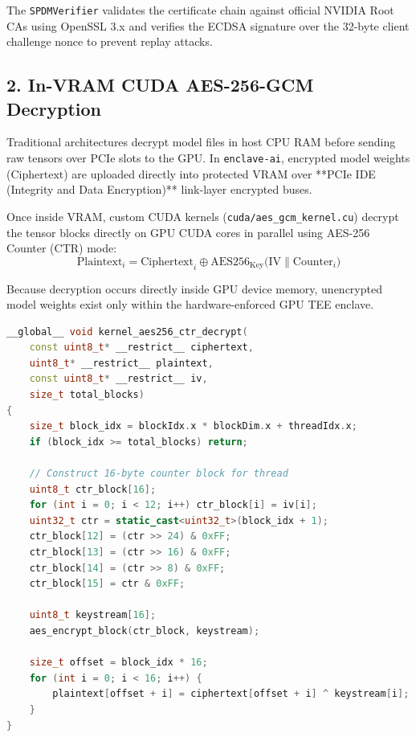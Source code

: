 \documentclass[11pt,a4paper]{article}
\begin{document}
The \texttt{SPDMVerifier} validates the certificate chain against official NVIDIA Root CAs using OpenSSL 3.x and verifies the ECDSA signature over the 32-byte client challenge nonce to prevent replay attacks.

\subsection{2. In-VRAM CUDA AES-256-GCM Decryption}
Traditional architectures decrypt model files in host CPU RAM before sending raw tensors over PCIe slots to the GPU. In \texttt{enclave-ai}, encrypted model weights ($\text{Ciphertext}$) are uploaded directly into protected VRAM over **PCIe IDE (Integrity and Data Encryption)** link-layer encrypted buses.

Once inside VRAM, custom CUDA kernels (\texttt{cuda/aes\_gcm\_kernel.cu}) decrypt the tensor blocks directly on GPU CUDA cores in parallel using AES-256 Counter (CTR) mode:
\begin{equation}
\text{Plaintext}_i = \text{Ciphertext}_i \oplus \text{AES256}_{\text{Key}}\Big( \text{IV} \parallel \text{Counter}_i \Big)
\end{equation}

Because decryption occurs directly inside GPU device memory, unencrypted model weights exist only within the hardware-enforced GPU TEE enclave.

\begin{lstlisting}[language=C++, caption={In-VRAM Parallel CUDA Decryption Kernel Excerpt}]
__global__ void kernel_aes256_ctr_decrypt(
    const uint8_t* __restrict__ ciphertext,
    uint8_t* __restrict__ plaintext,
    const uint8_t* __restrict__ iv,
    size_t total_blocks) 
{
    size_t block_idx = blockIdx.x * blockDim.x + threadIdx.x;
    if (block_idx >= total_blocks) return;

    // Construct 16-byte counter block for thread
    uint8_t ctr_block[16];
    for (int i = 0; i < 12; i++) ctr_block[i] = iv[i];
    uint32_t ctr = static_cast<uint32_t>(block_idx + 1);
    ctr_block[12] = (ctr >> 24) & 0xFF;
    ctr_block[13] = (ctr >> 16) & 0xFF;
    ctr_block[14] = (ctr >> 8) & 0xFF;
    ctr_block[15] = ctr & 0xFF;

    uint8_t keystream[16];
    aes_encrypt_block(ctr_block, keystream);

    size_t offset = block_idx * 16;
    for (int i = 0; i < 16; i++) {
        plaintext[offset + i] = ciphertext[offset + i] ^ keystream[i];
    }
}
\end{lstlisting}
\end{document}
